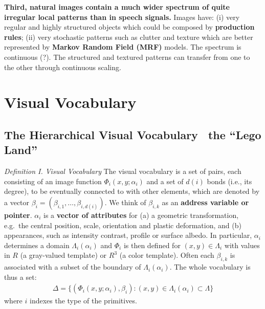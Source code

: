 \documentclass[../Notes_of_CaRiVaC.tex]{subfiles}
\begin{document}
\textbf{Third, natural images contain a much wider spectrum of quite irregular
local patterns than in speech signals.} Images have: (i) very regular and
highly structured objects which could be composed by \textbf{production rules};
(ii) very stochastic patterns such as clutter and texture which are better
represented by \textbf{Markov Random Field (MRF)} models. The spectrum is
continuous {\color{red} (?)}. The structured and textured patterns can transfer
from one to the other through continuous scaling\cite{wang2008}\cite{wu2008}.

\section{Visual Vocabulary}%
\label{sec:ii.2.2}
\subsection{The Hierarchical Visual Vocabulary \textendash~the ``Lego Land''}%
\label{sec:ii.2.2.1}
\begin{textbox}{\textit{Definition I. Visual Vocabulary}}
The visual vocabulary is a set of pairs, each consisting of an image function
$\Phi_i(x, y; \alpha_i)$ and a set of $d(i)$ bonds (i.e., its degree), to be
eventually connected to with other elements, which are denoted by a vector
$\beta_i = (\beta_{i,1}, \ldots, \beta_{i, d(i)})$. We think of $\beta_{i,k}$
as an \textbf{address variable or pointer}. $\alpha_i$ is a \textbf{vector of
attributes} for (a) a geometric transformation, e.g.\ the central position,
scale, orientation and plastic deformation, and (b) appearances, such as
intensity contrast, profile or surface albedo. In particular, $\alpha_i$
determines a domain $\Lambda_i(\alpha_i)$ and $\Phi_i$ is then defined for
$(x, y) \in \Lambda_i$ with values in $R$ (a gray-valued template) or $R^3$ (a
color template). Often each $\beta_{i,k}$ is associated with a subset of the
boundary of $\Lambda_i(\alpha_i)$. The whole vocabulary is thus a set:
%
\begin{align}
  \label{eq:ii.2.2}
  \Delta = \{(\Phi_i(x, y; \alpha_i), \beta_i): (x, y) \in  \Lambda_i(\alpha_i) \subset \Lambda\}
\end{align}
%
where $i$ indexes the type of the primitives.
\end{textbox}
\end{document}
